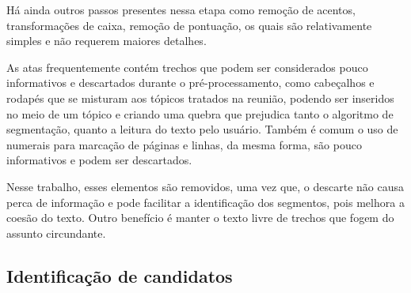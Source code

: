 Há ainda outros passos presentes nessa etapa como remoção de acentos, transformações de caixa, remoção de pontuação, os quais são relativamente simples e não requerem maiores detalhes.






As atas frequentemente contém trechos que podem ser considerados pouco informativos e descartados durante o pré-processamento, como cabeçalhos e rodapés que se misturam aos tópicos tratados na reunião, podendo ser  inseridos no meio de um tópico e criando uma quebra que prejudica tanto o algoritmo de segmentação, quanto a leitura do texto pelo usuário.
Também é comum o uso de numerais para marcação de páginas e linhas, da mesma forma, são pouco informativos e podem ser descartados.


Nesse trabalho, esses elementos são removidos, uma vez que, o descarte não causa perca de informação e pode facilitar a identificação dos segmentos, pois melhora a coesão do texto. Outro benefício é manter o texto livre de trechos que fogem do assunto circundante.





		



\subsection{Identificação de candidatos}
	\label{subsec:indentificacaosentencas}
	
	
